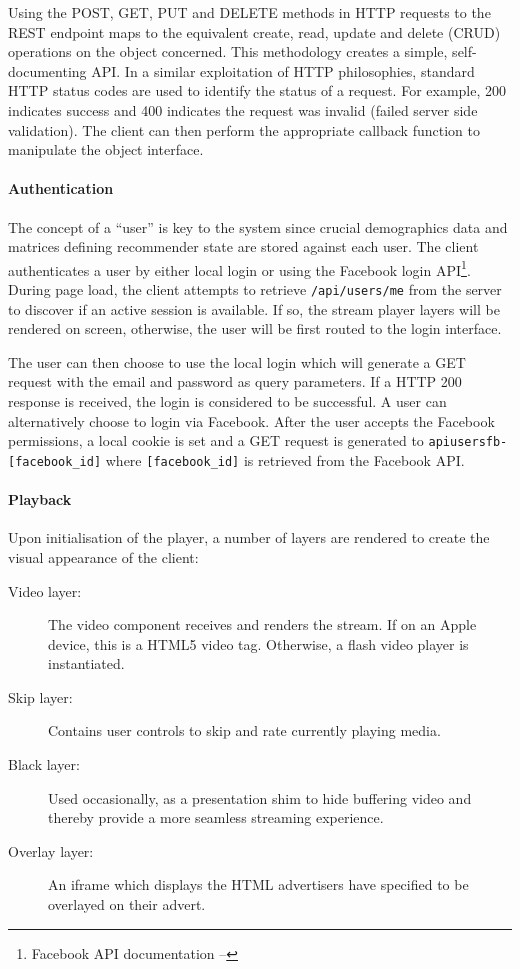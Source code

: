 Using the POST, GET, PUT and DELETE methods in HTTP requests to the REST endpoint maps to the equivalent create, read, update and delete (CRUD) operations on the object concerned. This methodology creates a simple, self-documenting API. In a similar exploitation of HTTP philosophies, standard HTTP status codes are used to identify the status of a request. For example, 200 indicates success and 400 indicates the request was invalid (failed server side validation). The client can then perform the appropriate callback function to manipulate the object interface.

\paragraph{Authentication}

The concept of a ``user'' is key to the system since crucial demographics data and matrices defining recommender state are stored against each user. The client authenticates a user by either local login or using the Facebook login API\footnote{Facebook API documentation -- }. During page load, the client attempts to retrieve \texttt{/api/users/me} from the server to discover if an active session is available. If so, the stream player layers will be rendered on screen, otherwise, the user will be first routed to the login interface.

The user can then choose to use the local login which will generate a GET request with the email and password as query parameters. If a HTTP 200 response is received, the login is considered to be successful. A user can alternatively choose to login via Facebook. After the user accepts the Facebook permissions, a local cookie is set and a GET request is generated to \texttt{\/api\/users\/fb-[facebook\_id]} where \texttt{[facebook\_id]} is retrieved from the Facebook API.

\paragraph{Playback}

Upon initialisation of the player, a number of layers are rendered to create the visual appearance of the client:

\begin{description}
	\item[Video layer:] The video component receives and renders the stream. If on an Apple device, this is a HTML5 video tag. Otherwise, a flash video player is instantiated.
	\item[Skip layer:] Contains user controls to skip and rate currently playing media.
	\item[Black layer:] Used occasionally, as a presentation shim to hide buffering video and thereby provide a more seamless streaming experience.
	\item[Overlay layer:] An iframe which displays the HTML advertisers have specified to be overlayed on their advert.
\end{description}

